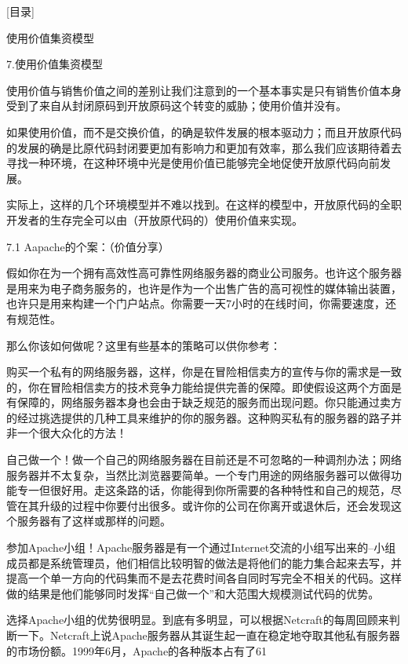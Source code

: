 \documentclass[a4paper,12pt,UTF8,twoside]{ctexbook}
\begin{document}
[目录]

使用价值集资模型

7.使用价值集资模型

使用价值与销售价值之间的差别让我们注意到的一个基本事实是只有销售价值本身受到了来自从封闭原码到开放原码这个转变的威胁；使用价值并没有。


如果使用价值，而不是交换价值，的确是软件发展的根本驱动力；而且开放原代码的发展的确是比原代码封闭要更加有影响力和更加有效率，那么我们应该期待着去寻找一种环境，在这种环境中光是使用价值已能够完全地促使开放原代码向前发展。


实际上，这样的几个环境模型并不难以找到。在这样的模型中，开放原代码的全职开发者的生存完全可以由（开放原代码的）使用价值来实现。


7.1 Aapache的个案：（价值分享）


假如你在为一个拥有高效性高可靠性网络服务器的商业公司服务。也许这个服务器是用来为电子商务服务的，也许是作为一个出售广告的高可视性的媒体输出装置，也许只是用来构建一个门户站点。你需要一天7小时的在线时间，你需要速度，还有规范性。


那么你该如何做呢？这里有些基本的策略可以供你参考：


购买一个私有的网络服务器，这样，你是在冒险相信卖方的宣传与你的需求是一致的，你在冒险相信卖方的技术竞争力能给提供完善的保障。即使假设这两个方面是有保障的，网络服务器本身也会由于缺乏规范的服务而出现问题。你只能通过卖方的经过挑选提供的几种工具来维护的你的服务器。这种购买私有的服务器的路子并非一个很大众化的方法！


自己做一个！做一个自己的网络服务器在目前还是不可忽略的一种调剂办法；网络服务器并不太复杂，当然比浏览器要简单。一个专门用途的网络服务器可以做得功能专一但很好用。走这条路的话，你能得到你所需要的各种特性和自己的规范，尽管在其升级的过程中你要付出很多。或许你的公司在你离开或退休后，还会发现这个服务器有了这样或那样的问题。


参加Apache小组！Apache服务器是有一个通过Internet交流的小组写出来的--小组成员都是系统管理员，他们相信比较明智的做法是将他们的能力集合起来去写，并提高一个单一方向的代码集而不是去花费时间各自同时写完全不相关的代码。这样做的结果是他们能够同时发挥“自己做一个”和大范围大规模测试代码的优势。


选择Apache小组的优势很明显。到底有多明显，可以根据Netcraft的每周回顾来判断一下。Netcraft上说Apache服务器从其诞生起一直在稳定地夺取其他私有服务器的市场份额。1999年6月，Apache的各种版本占有了61%
\end{document}
